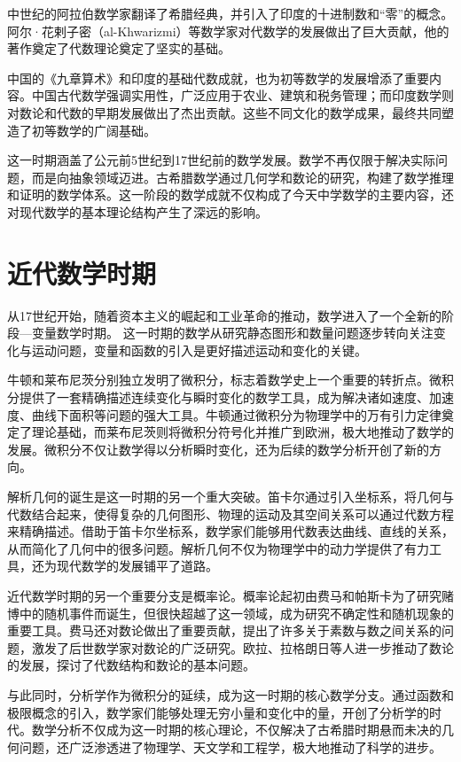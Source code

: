 中世纪的阿拉伯数学家翻译了希腊经典，并引入了印度的十进制数和“零”的概念。阿尔·花剌子密（al-Khwarizmi）等数学家对代数学的发展做出了巨大贡献，他的著作奠定了代数理论奠定了坚实的基础。

中国的《九章算术》和印度的基础代数成就，也为初等数学的发展增添了重要内容。中国古代数学强调实用性，广泛应用于农业、建筑和税务管理；而印度数学则对数论和代数的早期发展做出了杰出贡献。这些不同文化的数学成果，最终共同塑造了初等数学的广阔基础。

这一时期涵盖了公元前5世纪到17世纪前的数学发展。数学不再仅限于解决实际问题，而是向抽象领域迈进。古希腊数学通过几何学和数论的研究，构建了数学推理和证明的数学体系。这一阶段的数学成就不仅构成了今天中学数学的主要内容，还对现代数学的基本理论结构产生了深远的影响。

\section{近代数学时期}
从17世纪开始，随着资本主义的崛起和工业革命的推动，数学进入了一个全新的阶段---变量数学时期。
这一时期的数学从研究静态图形和数量问题逐步转向关注变化与运动问题，变量和函数的引入是更好描述运动和变化的关键。

牛顿和莱布尼茨分别独立发明了微积分，标志着数学史上一个重要的转折点。微积分提供了一套精确描述连续变化与瞬时变化的数学工具，成为解决诸如速度、加速度、曲线下面积等问题的强大工具。牛顿通过微积分为物理学中的万有引力定律奠定了理论基础，而莱布尼茨则将微积分符号化并推广到欧洲，极大地推动了数学的发展。微积分不仅让数学得以分析瞬时变化，还为后续的数学分析开创了新的方向。

解析几何的诞生是这一时期的另一个重大突破。笛卡尔通过引入坐标系，将几何与代数结合起来，使得复杂的几何图形、物理的运动及其空间关系可以通过代数方程来精确描述。借助于笛卡尔坐标系，数学家们能够用代数表达曲线、直线的关系，从而简化了几何中的很多问题。解析几何不仅为物理学中的动力学提供了有力工具，还为现代数学的发展铺平了道路。

近代数学时期的另一个重要分支是概率论。概率论起初由费马和帕斯卡为了研究赌博中的随机事件而诞生，但很快超越了这一领域，成为研究不确定性和随机现象的重要工具。费马还对数论做出了重要贡献，提出了许多关于素数与数之间关系的问题，激发了后世数学家对数论的广泛研究。欧拉、拉格朗日等人进一步推动了数论的发展，探讨了代数结构和数论的基本问题。

与此同时，分析学作为微积分的延续，成为这一时期的核心数学分支。通过函数和极限概念的引入，数学家们能够处理无穷小量和变化中的量，开创了分析学的时代。数学分析不仅成为这一时期的核心理论，不仅解决了古希腊时期悬而未决的几何问题，还广泛渗透进了物理学、天文学和工程学，极大地推动了科学的进步。

